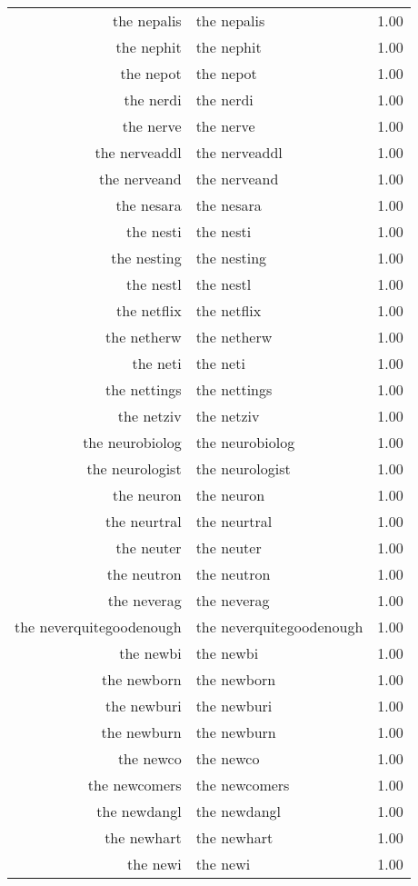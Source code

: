 \begin{table}[ht]
\begin{tabular}{rlr}
  the nepalis & the nepalis & 1.00 \\ 
  the nephit & the nephit & 1.00 \\ 
  the nepot & the nepot & 1.00 \\ 
  the nerdi & the nerdi & 1.00 \\ 
  the nerve & the nerve & 1.00 \\ 
  the nerveaddl & the nerveaddl & 1.00 \\ 
  the nerveand & the nerveand & 1.00 \\ 
  the nesara & the nesara & 1.00 \\ 
  the nesti & the nesti & 1.00 \\ 
  the nesting & the nesting & 1.00 \\ 
  the nestl & the nestl & 1.00 \\ 
  the netflix & the netflix & 1.00 \\ 
  the netherw & the netherw & 1.00 \\ 
  the neti & the neti & 1.00 \\ 
  the nettings & the nettings & 1.00 \\ 
  the netziv & the netziv & 1.00 \\ 
  the neurobiolog & the neurobiolog & 1.00 \\ 
  the neurologist & the neurologist & 1.00 \\ 
  the neuron & the neuron & 1.00 \\ 
  the neurtral & the neurtral & 1.00 \\ 
  the neuter & the neuter & 1.00 \\ 
  the neutron & the neutron & 1.00 \\ 
  the neverag & the neverag & 1.00 \\ 
  the neverquitegoodenough & the neverquitegoodenough & 1.00 \\ 
  the newbi & the newbi & 1.00 \\ 
  the newborn & the newborn & 1.00 \\ 
  the newburi & the newburi & 1.00 \\ 
  the newburn & the newburn & 1.00 \\ 
  the newco & the newco & 1.00 \\ 
  the newcomers & the newcomers & 1.00 \\ 
  the newdangl & the newdangl & 1.00 \\ 
  the newhart & the newhart & 1.00 \\ 
  the newi & the newi & 1.00 \\ 

\end{tabular}
\end{table}
